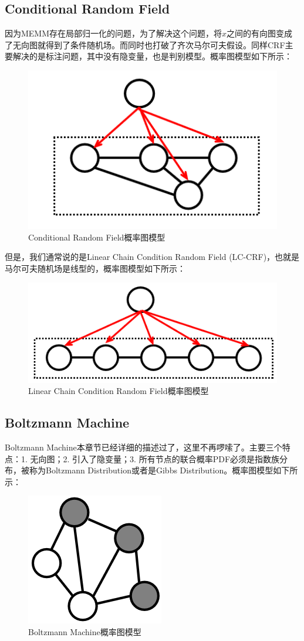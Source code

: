 \documentclass[a4paper]{article}
\begin{document}
\subsection{Conditional Random Field}
因为MEMM存在局部归一化的问题，为了解决这个问题，将$x$之间的有向图变成了无向图就得到了条件随机场。而同时也打破了齐次马尔可夫假设。同样CRF主要解决的是标注问题，其中没有隐变量，也是判别模型。概率图模型如下所示：
\begin{figure}[H]
    \centering
    \includegraphics[width=.35\textwidth]{微信图片_20200229221504.png}
    \caption{Conditional Random Field概率图模型}
    
\end{figure}
但是，我们通常说的是Linear Chain Condition Random Field (LC-CRF)，也就是马尔可夫随机场是线型的，概率图模型如下所示：
\begin{figure}[H]
    \centering
    \includegraphics[width=.35\textwidth]{微信图片_20200229222221.png}
    \caption{Linear Chain Condition Random Field概率图模型}
    
\end{figure}
\subsection{Boltzmann Machine}
Boltzmann Machine本章节已经详细的描述过了，这里不再啰嗦了。主要三个特点：1. 无向图；2. 引入了隐变量；3. 所有节点的联合概率PDF必须是指数族分布，被称为Boltzmann Distribution或者是Gibbs Distribution。概率图模型如下所示：
\begin{figure}[H]
    \centering
    \includegraphics[width=.2\textwidth]{微信图片_20200228220817.png}
    \caption{Boltzmann Machine概率图模型}
    
\end{figure}
\end{document}
